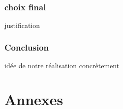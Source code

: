 \documentclass[paper=a4,12pt]{article}
\numberwithin{equation}{section}		%
\numberwithin{figure}{section}			%
\numberwithin{table}{section}				%
\begin{document}
\section{choix final}

justification

\section{Conclusion}
idée de notre réalisation concrètement


  \newpage

%  
%  
%
  \appendix
  \part*{Annexes}
  
  

  
  

 


\end{document}
